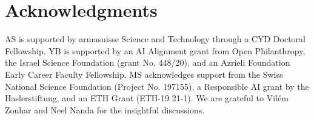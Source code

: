 \documentclass[11pt]{article}
\begin{document}
\section*{Acknowledgments}
AS is supported by armasuisse Science and Technology through a CYD Doctoral Fellowship. 
YB is supported by an AI Alignment grant from Open Philanthropy, the Israel Science Foundation (grant No. 448/20), and an Azrieli Foundation Early Career Faculty Fellowship.
MS acknowledges support from the Swiss National Science Foundation (Project No. 197155), a Responsible AI grant by the Haslerstiftung, and an ETH Grant (ETH-19 21-1).
We are grateful to Vilém Zouhar and Neel Nanda for the insightful discussions.
















\clearpage

\appendix
\end{document}
